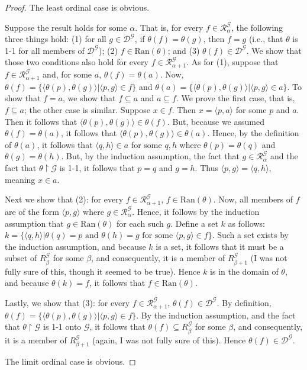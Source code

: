 \documentclass{article}
\theoremstyle{definition}
\begin{document}
\begin{proof}

The least ordinal case is obvious.

Suppose the result holds for some $\alpha$. That is, for every $f\in\mathcal{R}^\mathcal{G}_\alpha$, the following three things hold:
(1) for all $g\in\mathcal{D}^\mathcal{G}$, if $\theta(f)=\theta(g)$, then $f=g$ (i.e., that $\theta$ is 1-1 for all members 
of $\mathcal{D}^\mathcal{G}$); (2) $f\in\textrm{Ran}(\theta)$; and (3) $\theta(f)\in\mathcal{D}^\mathcal{G}$.
We show that those two conditions also hold for every $f\in\mathcal{R}^\mathcal{G}_{\alpha+1}$. As for (1), suppose that 
$f\in\mathcal{R}^\mathcal{G}_{\alpha+1}$ and, for some $a$, $\theta(f)=\theta(a)$. 
Now, $\theta(f)=\{\langle\theta(p),\theta(g)\rangle|\langle p,g\rangle\in f\}$ and 
$\theta(a)=\{\langle\theta(p),\theta(g)\rangle|\langle p,g\rangle\in a\}$.
To show that $f=a$, we show that $f\subseteq a$ and $a\subseteq f$. We prove the first case, that is, $f\subseteq a$; the other case 
is similar. Suppose $x\in f$. Then $x=\langle p,a\rangle$ for some $p$ and $a$. Then it follows that 
$\langle\theta(p),\theta(g)\rangle\in\theta(f)$. But, because we assumed $\theta(f)=\theta(a)$, it follows that 
$\langle\theta(p),\theta(g)\rangle\in\theta(a)$. Hence, by the definition of $\theta(a)$, it follows that 
$\langle q,h\rangle\in a$ for some $q,h$ where $\theta(p)=\theta(q)$ and $\theta(g)=\theta(h)$. But, by the induction assumption, the 
fact that $g\in\mathcal{R}^\mathcal{G}_\alpha$ and the fact that $\theta\restriction\mathcal{G}$ is 1-1, it follows that 
$p=q$ and $g=h$. Thus $\langle p,g\rangle=\langle q,h\rangle$, meaning $x\in a$.

Next we show that (2): for every $f\in\mathcal{R}^\mathcal{G}_{\alpha+1}$, $f\in\textrm{Ran}(\theta)$. Now, all members of 
$f$ are of the form $\langle p,g\rangle$ where $g\in\mathcal{R}^\mathcal{G}_\alpha$. Hence, it follows by the induction assumption 
that $g\in\textrm{Ran}(\theta)$ for each such $g$. Define a set $k$ as follows:
$k=\{\langle q,h\rangle|\theta(q)=p\textrm{ and }\theta(h)=g\textrm{ for some }\langle p,g\rangle\in f\}$. 
Such a set exists by the induction assumption, and because $k$ is a set, it follows that it must be a subset of 
$R^\mathcal{G}_\beta$ for some $\beta$, and consequently, it is a member of $R^\mathcal{G}_{\beta+1}$ (I was not fully 
sure of this, though it seemed to be true). Hence $k$ is in the domain of $\theta$, and because 
$\theta(k)=f$, it follows that $f\in\textrm{Ran}(\theta)$.

Lastly, we show that (3): for every $f\in\mathcal{R}^\mathcal{G}_{\alpha+1}$, $\theta(f)\in\mathcal{D}^\mathcal{G}$.
By definition, $\theta(f)=\{\langle\theta(p),\theta(g)\rangle|\langle p,g\rangle\in f\}$. By the induction assumption, and 
the fact that $\theta\restriction\mathcal{G}$ is 1-1 onto $\mathcal{G}$, it follows that 
$\theta(f)\subseteq R^\mathcal{G}_\beta$ for some $\beta$, and consequently, it is a member of $R^\mathcal{G}_{\beta+1}$ (again, I was 
not fully sure of this). Hence $\theta(f)\in\mathcal{D}^\mathcal{G}$. 

The limit ordinal case is obvious.

\end{proof}
\end{document}
